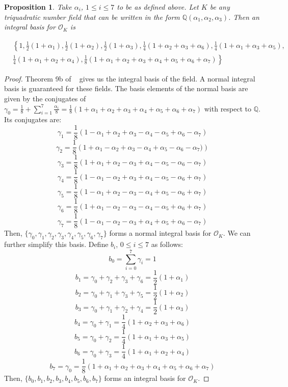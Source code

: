 \documentclass{amsart}
\newtheorem{Proposition}{Proposition}
\begin{document}
\begin{Proposition} Take $\alpha_i$, $1\leq i\leq 7$ to be as defined above. Let $K$ be any triquadratic number field that can be written in the form $\mathbb{Q}\left(\alpha_1, \alpha_2,\alpha_3\right)$. Then an integral basis for $\mathcal{O}_K$ is


\begin{align*}
      & \left\{1, \frac{1}{2}(1+\alpha_1), \frac{1}{2}(1+\alpha_2), \frac{1}{2}(1+\alpha_3), \frac{1}{4}(1+\alpha_2 + \alpha_3 + \alpha_6), \frac{1}{4}(1+\alpha_1 + \alpha_3 + \alpha_5), \right. \\
      & \left.\frac{1}{4}(1 + \alpha_1 + \alpha_2 + \alpha_4), \frac{1}{8}(1 + \alpha_1 + \alpha_2 + \alpha_3 + \alpha_4 + \alpha_5 + \alpha_6 + \alpha_7)\right\}
\end{align*}





\end{Proposition}
\begin{proof} Theorem 9b of ~\cite{Chat} gives us the integral basis of the field.  A normal integral basis is guaranteed for these fields. The basis elements of the normal basis are given by the conjugates of $\gamma_0 = \frac{1}{8}+\sum_{i=1}^{7} \frac{\alpha_i}{8} = \frac{1}{8}\left(1+\alpha_1+\alpha_2+\alpha_3+\alpha_4+\alpha_5+\alpha_6+\alpha_7\right)$ with respect to $\mathbb{Q}$. Its conjugates are:
$$ \gamma_1 = \frac{1}{8}\left(1-\alpha_1+\alpha_2+\alpha_3-\alpha_4 - \alpha_5 + \alpha_6 - \alpha_7\right)$$
$$ \gamma_2 = \frac{1}{8}\left(1+\alpha_1-\alpha_2+\alpha_3-\alpha_4 + \alpha_5 - \alpha_6 - \alpha_7)\right)$$
$$ \gamma_3 = \frac{1}{8}\left(1+\alpha_1+\alpha_2-\alpha_3+\alpha_4 - \alpha_5 - \alpha_6 - \alpha_7\right)$$
$$\gamma_4 = \frac{1}{8}\left(1-\alpha_1-\alpha_2+\alpha_3+\alpha_4 - \alpha_5 - \alpha_6 + \alpha_7\right)$$
$$\gamma_5 = \frac{1}{8}\left(1-\alpha_1+\alpha_2-\alpha_3-\alpha_4 + \alpha_5 - \alpha_6 + \alpha_7\right)$$
$$\gamma_6 =  \frac{1}{8}\left(1+\alpha_1-\alpha_2-\alpha_3-\alpha_4 - \alpha_5 + \alpha_6 + \alpha_7\right)$$
$$\gamma_7 =  \frac{1}{8}\left(1-\alpha_1-\alpha_2-\alpha_3+\alpha_4 + \alpha_5 + \alpha_6 - \alpha_7 \right)$$
Then, $\{\gamma_0,\gamma_1,\gamma_2,\gamma_3,\gamma_4,\gamma_5,\gamma_6,\gamma_7\}$ forms a normal integral basis for $\mathcal{O}_K$. We can further simplify this basis. Define $b_i$, $0\leq i\leq 7$ as follows:
$$b_0 = \sum_{i=0}^7 \gamma_i = 1$$
$$b_1 = \gamma_0+\gamma_2+\gamma_3+\gamma_6 = \frac{1}{2}(1+\alpha_1)$$
$$b_2 = \gamma_0 + \gamma_1 +\gamma_3 + \gamma_5 = \frac{1}{2}(1+\alpha_2)$$
$$b_3 = \gamma_0 + \gamma_1 + \gamma_2 + \gamma_4 = \frac{1}{2}(1+\alpha_3)$$
$$b_4 = \gamma_0 + \gamma_1 = \frac{1}{4}(1+\alpha_2 + \alpha_3 + \alpha_6)$$
$$b_5 = \gamma_0 + \gamma_2  = \frac{1}{4}(1+\alpha_1 + \alpha_3 + \alpha_5)$$
$$b_6 = \gamma_0 + \gamma_3 =  \frac{1}{4}(1+\alpha_1 + \alpha_2 + \alpha_4)$$
$$b_7 = \gamma_0  = \frac{1}{8}(1+\alpha_1 + \alpha_2 + \alpha_3 + \alpha_4 + \alpha_5 + \alpha_6 + \alpha_7)$$
Then, $\{b_0,b_1,b_2,b_3,b_4,b_5,b_6,b_7\}$ forms an integral basis for $\mathcal{O}_K$. 
\end{proof}
\end{document}
